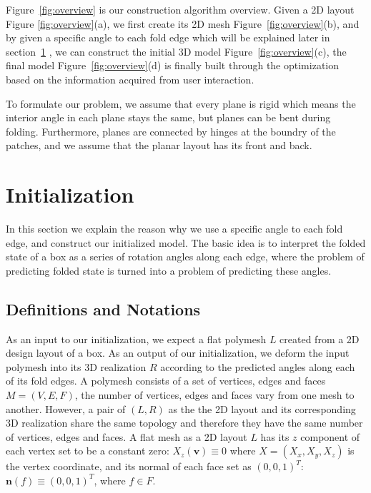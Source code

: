 \documentclass[submission]{gmp2018}
\begin{document}
Figure~\ref{fig:overview} is our construction algorithm overview. Given a 2D layout Figure \ref{fig:overview}(a), we first create its 2D mesh Figure~\ref{fig:overview}(b), and by given a specific angle to each fold edge which will be explained later in section~\ref{sec:initialization} , we can construct the initial 3D model Figure~\ref{fig:overview}(c), the final model Figure~\ref{fig:overview}(d) is finally built through the optimization based on the information acquired from user interaction.

To formulate our problem, we assume that every plane is rigid which means the interior angle in each plane stays the same, but planes can be bent during folding. Furthermore, planes are connected by hinges at the boundry of the patches, and we assume that the planar layout has its front and back.


\section{Initialization}\label{sec:initialization}
In this section we explain the reason why we use a specific angle to each fold edge, and construct our initialized model. The basic idea is to interpret the folded state of a box as a series of rotation angles along each edge, where the problem of predicting folded state is turned into a problem of predicting these angles.

\subsection{Definitions and Notations}
As an input to our initialization, we expect a flat polymesh $L$ created from a 2D design layout of a box. As an output of our initialization, we deform the input polymesh into its 3D realization $R$ according to the predicted angles along each of its fold edges. A polymesh consists of a set of vertices, edges and faces $M = (V,E,F)$, the number of vertices, edges and faces vary from one mesh to another. However, a pair of $(L,R)$ as the the 2D layout and its corresponding 3D realization share the same topology and therefore they have the same number of vertices, edges and faces. A flat mesh as a 2D layout $L$ has its $z$ component of each vertex set to be a constant zero: $X_z(\mathbf{v}) \equiv 0$ where $X = (X_x,X_y,X_z)$ is the vertex coordinate, and its normal of each face set as $(0,0,1)^T$: $\mathbf{n}(f) \equiv (0,0,1)^T$, where $f \in F$.
\end{document}
